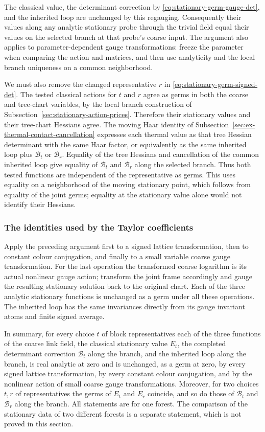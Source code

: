 The classical value, the determinant correction by
\eqref{eq:stationary-germ-gauge-det}, and the inherited loop are
unchanged by this regauging. Consequently their values along any
analytic stationary probe through the trivial field equal their
values on the selected branch at that probe's coarse input. The
argument also applies to parameter-dependent gauge transformations:
freeze the parameter when comparing the action and matrices, and
then use analyticity and the local branch uniqueness on a common
neighborhood.

We must also remove the changed representative $r$ in
\eqref{eq:stationary-germ-signed-det}. The tested classical actions
for $t$ and $r$ agree as germs in both the coarse and tree-chart
variables, by the local branch construction of
Subsection~\ref{sec:stationary-action-prices}. Therefore their
stationary values and their tree-chart Hessians agree. The moving
Haar identity of Subsection~\ref{sec:ex-thermal-contact-cancellation}
expresses each thermal value as that tree Hessian determinant with
the same Haar factor, or equivalently as the same inherited loop
plus $\mathcal B_t$ or $\mathcal B_r$. Equality of the tree Hessians
and cancellation of the common inherited loop give equality of
$\mathcal B_t$ and $\mathcal B_r$ along the selected branch. Thus
both tested functions are independent of the representative as germs.
This uses equality on a neighborhood of the moving stationary point,
which follows from equality of the joint germs; equality at the
stationary value alone would not identify their Hessians.

\subsubsection{The identities used by the Taylor coefficients}
Apply the preceding argument first to a signed lattice transformation,
then to constant colour conjugation, and finally to a small variable
coarse gauge transformation. For the last operation the transformed
coarse logarithm is its actual nonlinear gauge action; transform the
joint frame accordingly and gauge the resulting stationary solution
back to the original chart. Each of the three analytic stationary
functions is unchanged as a germ under all these operations. The
inherited loop has the same invariances directly from its gauge
invariant atoms and finite signed average.

In summary, for every choice $t$ of block representatives each of the
three functions of the coarse link field, the classical stationary
value $E_t$, the completed determinant correction $\mathcal B_t$ along
the branch, and the inherited loop along the branch, is real analytic
at zero and is unchanged, as a germ at zero, by every signed lattice
transformation, by every constant colour conjugation, and by the
nonlinear action of small coarse gauge transformations. Moreover, for
two choices $t,r$ of representatives the germs of $E_t$ and $E_r$
coincide, and so do those of $\mathcal B_t$ and $\mathcal B_r$ along
the branch. All statements are for one forest. The comparison of the
stationary data of two different forests is a separate statement,
which is not proved in this section.

